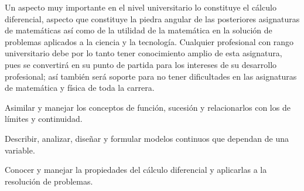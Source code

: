 \begin{syllabus}


\begin{justification}
Un aspecto muy importante en el nivel universitario lo constituye el cálculo diferencial,  aspecto que constituye la piedra angular de las posteriores asignaturas de matemáticas así­ como de la utilidad de la matemática en la solución de problemas aplicados a la ciencia y la tecnología. Cualquier profesional con rango universitario debe por lo tanto tener conocimiento amplio de esta asignatura, pues se convertirá en su punto de partida para los intereses de su desarrollo profesional; así­ también será soporte para no tener dificultades en las asignaturas de matemática y física de toda la carrera.
\end{justification}

\begin{goals}
\item Asimilar y manejar los conceptos de función, sucesión y relacionarlos con los de límites y continuidad.
\item Describir, analizar, diseñar y formular modelos continuos que dependan de una variable.
\item Conocer y manejar la propiedades del cálculo diferencial y aplicarlas a la resolución de problemas.
\end{goals}

\begin{outcomes}
    \item {}
    \item {}
\end{outcomes}

\begin{competences}
    \item {}
    \item {}
    \item {}
\end{competences}


\end{syllabus}
